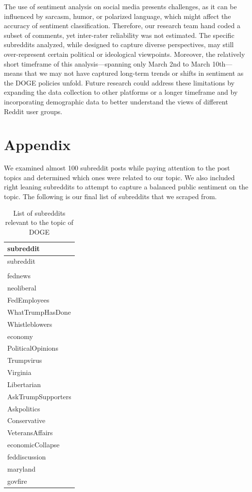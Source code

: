 \documentclass[
  12pt]{article}
\begin{document}
The use of sentiment analysis on social media presents challenges, as it
can be influenced by sarcasm, humor, or polarized language, which might
affect the accuracy of sentiment classification. Therefore, our research
team hand coded a subset of comments, yet inter-rater reliability was
not estimated. The specific subreddits analyzed, while designed to
capture diverse perspectives, may still over-represent certain political
or ideological viewpoints. Moreover, the relatively short timeframe of
this analysis---spanning only March 2nd to March 10th---means that we
may not have captured long-term trends or shifts in sentiment as the
DOGE policies unfold. Future research could address these limitations by
expanding the data collection to other platforms or a longer timeframe
and by incorporating demographic data to better understand the views of
different Reddit user groups.

\newpage

\section{Appendix}\label{appendix}

We examined almost 100 subreddit posts while paying attention to the
post topics and determined which ones were related to our topic. We also
included right leaning subreddits to attempt to capture a balanced
public sentiment on the topic. The following is our final list of
subreddits that we scraped from.

\begin{longtable}[]{@{}l@{}}
\caption{List of subreddits relevant to the topic of
DOGE}\tabularnewline
\toprule\noalign{}
subreddit \\
\midrule\noalign{}
\endfirsthead
\toprule\noalign{}
subreddit \\
\midrule\noalign{}
\endhead
\bottomrule\noalign{}
\endlastfoot
50501 \\
fednews \\
neoliberal \\
FedEmployees \\
WhatTrumpHasDone \\
Whistleblowers \\
economy \\
PoliticalOpinions \\
Trumpvirus \\
Virginia \\
Libertarian \\
AskTrumpSupporters \\
Askpolitics \\
Conservative \\
VeteransAffairs \\
economicCollapse \\
feddiscussion \\
maryland \\
govfire \\
\end{longtable}
\end{document}
